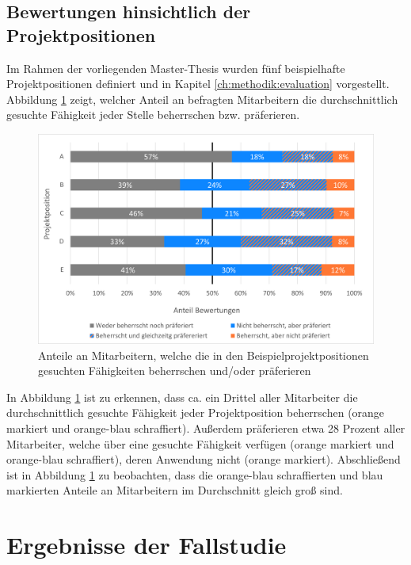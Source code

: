 \subsection{Bewertungen hinsichtlich der Projektpositionen}
\label{ch:ergebnisse:analyse:projektpositionen}
Im Rahmen der vorliegenden Master-Thesis wurden fünf beispielhafte Projektpositionen definiert und in Kapitel \ref{ch:methodik:evaluation} vorgestellt. Abbildung \ref{fig:ergebnisse:analyse:abb5} zeigt, welcher Anteil an befragten Mitarbeitern die durchschnittlich gesuchte Fähigkeit jeder Stelle beherrschen bzw. präferieren.

\begin{figure}[h]
	\centering
	\includegraphics[width=1\textwidth]{gfx/anteil-bewertungen-je-projektposition.png}
	\caption{Anteile an Mitarbeitern, welche die in den Beispielprojektpositionen gesuchten Fähigkeiten beherrschen und/oder präferieren}
	\label{fig:ergebnisse:analyse:abb5}
\end{figure}

In Abbildung \ref{fig:ergebnisse:analyse:abb5} ist zu erkennen, dass ca. ein Drittel aller Mitarbeiter die durchschnittlich gesuchte Fähigkeit jeder Projektposition beherrschen (orange markiert und orange-blau schraffiert). Außerdem präferieren etwa 28 Prozent aller Mitarbeiter, welche über eine gesuchte Fähigkeit verfügen (orange markiert und orange-blau schraffiert), deren Anwendung nicht (orange markiert). Abschließend ist in Abbildung \ref{fig:ergebnisse:analyse:abb5} zu beobachten, dass die orange-blau schraffierten und blau markierten Anteile an Mitarbeitern im Durchschnitt gleich groß sind.

\newpage
\section{Ergebnisse der Fallstudie}
\label{ch:ergebnisse:fallstudie}

